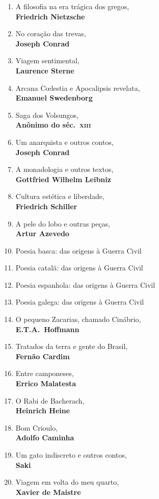 \begin{enumerate} [font=\Formular\scriptsize]
\item A filosofia na era trágica dos gregos,\\ \textbf{Friedrich Nietzsche}
\item No coração das trevas,\\ \textbf{Joseph Conrad}
\item Viagem sentimental,\\ \textbf{Laurence Sterne}
\item Arcana C\oe lestia e Apocalipsis revelata,\\ \textbf{Emanuel Swedenborg}
\item Saga dos Volsungos,\\ \textbf{Anônimo do séc.~\textsc{xiii}}
\item Um anarquista e outros contos,\\ \textbf{Joseph Conrad}
\item A monadologia e outros textos,\\ \textbf{Gottfried Wilhelm Leibniz}
\item Cultura estética e liberdade,\\ \textbf{Friedrich Schiller}
\item A pele do lobo e outras peças,\\ \textbf{Artur Azevedo}
\item Poesia basca: das origens à Guerra Civil 
\item Poesia catalã: das origens à Guerra Civil 
\item Poesia espanhola: das origens à Guerra Civil 
\item Poesia galega: das origens à Guerra Civil 
\item O pequeno Zacarias, chamado Cinábrio,\\ \textbf{E.T.A.~Hoffmann}
\item Tratados da terra e gente do Brasil,\\ \textbf{Fernão Cardim}
\item Entre camponeses,\\ \textbf{Errico Malatesta}
\item O Rabi de Bacherach,\\ \textbf{Heinrich Heine}
\item Bom Crioulo,\\ \textbf{Adolfo Caminha}
\item Um gato indiscreto e outros contos,\\ \textbf{Saki}
\item Viagem em volta do meu quarto,\\ \textbf{Xavier de Maistre }

\end{enumerate}
